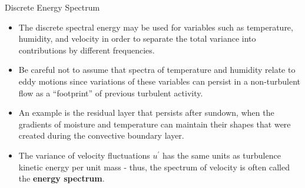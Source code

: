 \begin{frame}{Discrete Energy Spectrum}
\begin{itemize}
	\item The discrete spectral energy may be used for variables such as temperature, humidity, and velocity in order to separate the total variance into contributions by different frequencies.
	\item Be careful not to assume that spectra of temperature and humidity relate to eddy motions since variations of these variables can persist in a non-turbulent flow as a ``footprint'' of previous turbulent activity.
	\item An example is the residual layer that persists after sundown, when the gradients of moisture and temperature can maintain their shapes that were created during the convective boundary layer.
	\item The variance of velocity fluctuations $u^\prime$ has the same units as turbulence kinetic energy per unit mass - thus, the spectrum of velocity is often called the \textbf{energy spectrum}.
\end{itemize}
\end{frame}

